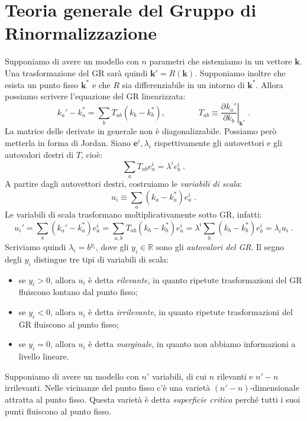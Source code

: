 \documentclass[10pt,a4paper]{report}
\theoremstyle{definition}
\newcommand{\pdev}[3][]{\frac{\partial^{#1} #2}{\partial #3^{#1}}}
\numberwithin{equation}{section}
\begin{document}
\section{Teoria generale del Gruppo di Rinormalizzazione}
Supponiamo di avere un modello con $n$ parametri che sistemiamo in un vettore $\mathbf{k}$. Una trasformazione del GR sarà quindi $\mathbf{k}'=R(\mathbf{k})$. Supponiamo inoltre che esista un punto fisso $\mathbf{k}^*$ e che $R$ sia differenziabile in un intorno di $\mathbf{k}^*$. Allora possiamo scrivere l'equazione del GR linearizzata:
\begin{equation}
k_a'-k_a^*=\sum_b T_{ab}(k_b-k_b^*),\qquad\qquad T_{ab}\equiv \left.\pdev{k_a'}{k_b}\right|_{\mathbf{k}^*}\;.
\end{equation}
La matrice delle derivate in generale non è diagonalizzabile. Possiamo però metterla in forma di Jordan. Siano $\mathbf{e}^i,\lambda_i$ rispettivamente gli autovettori e gli autovalori destri di $T$, cioè:
\begin{equation}
\sum_a T_{ab}e_a^i=\lambda^ie_b^i\;.
\end{equation}
A partire dagli autovettori destri, costruiamo le \emph{variabili di scala}:
\begin{equation}
u_i\equiv \sum_a (k_a-k_a^*)e_a^i\;.
\end{equation}
Le variabili di scala trasformano moltiplicativamente sotto GR, infatti:
\begin{equation}
u_i'=\sum_a (k_a'-k_a^*)e_a^i=\sum_{a,b}T_{ab}(k_b-k_b^*)e_a^i=\lambda^i\sum_b(k_b-k_b^*)e_b^i=\lambda_iu_i\;.
\end{equation}
Scriviamo quindi $\lambda_i=b^{y_i}$, dove gli $y_i\in \mathbb{R}$ sono gli \emph{autovalori del GR}. Il segno degli $y_i$ distingue tre tipi di variabili di scala:
\begin{itemize}
\item se $y_i>0$, allora $u_i$ è detta \emph{rilevante}, in quanto ripetute trasformazioni del GR fluiscono lontano dal punto fisso;
\item se $y_i<0$, allora $u_i$ è detta \emph{irrilevante}, in quanto ripetute trasformazioni del GR fluiscono al punto fisso;
\item se $y_i=0$, allora $u_i$ è detta \emph{marginale}, in quanto non abbiamo informazioni a livello lineare.
\end{itemize}
Supponiamo di avere un modello con $n'$ variabili, di cui $n$ rilevanti e $n'-n$ irrilevanti. Nelle vicinanze del punto fisso c'è una varietà $(n'-n)$-dimensionale attratta al punto fisso. Questa varietà è detta \emph{superficie critica} perché tutti i suoi punti fluiscono al punto fisso. \\
\end{document}

